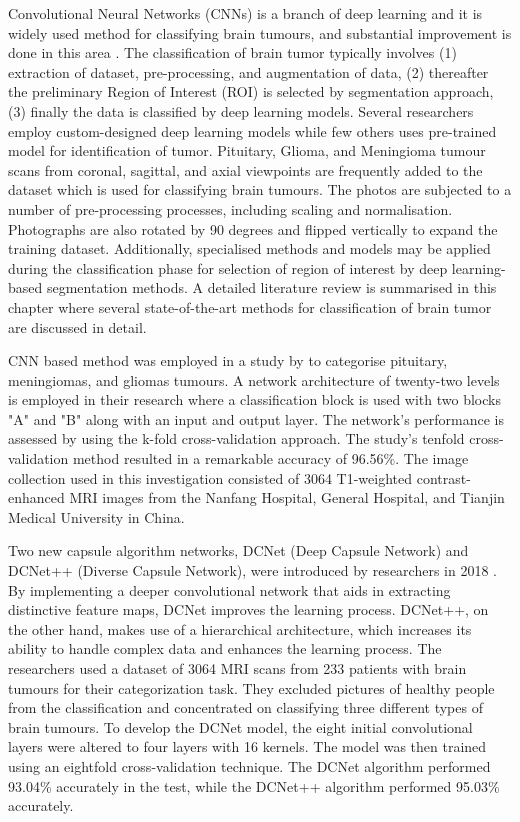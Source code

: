 \documentclass[12pt, a4paper,twoside]{report}
\theoremstyle{plain} %
\theoremstyle{definition} %
\theoremstyle{remark} %
\numberwithin{equation}{chapter}
\begin{document}
Convolutional Neural Networks (CNNs) is a branch of deep learning and it is widely used method for classifying brain tumours, and substantial improvement is done in this area \cite{ali22}. The classification of brain tumor typically involves (1) extraction of dataset, pre-processing, and augmentation of data, (2) thereafter the preliminary Region of Interest (ROI) is selected by segmentation approach, (3) finally the data is classified by deep learning models. Several researchers employ  custom-designed deep learning models while few others uses pre-trained model for identification of tumor. Pituitary, Glioma, and Meningioma tumour scans from coronal, sagittal, and axial viewpoints are frequently added to the dataset which is used for classifying brain tumours. The photos are subjected to a number of pre-processing processes, including scaling and normalisation. Photographs are also rotated by 90 degrees and flipped vertically to expand the training dataset. Additionally, specialised methods and models may be applied during the classification phase for selection of region of interest by deep learning-based segmentation methods. A detailed literature review is summarised in this chapter where several state-of-the-art methods for classification of brain tumor are discussed in detail.

CNN based method was employed in a study by \cite{badza20} to categorise pituitary, meningiomas, and gliomas tumours. A network architecture of twenty-two levels is employed in their research where a classification block is used with two blocks "A" and "B" along with an input and output layer. The network's performance is assessed by using the k-fold cross-validation approach. The study's tenfold cross-validation method resulted in a remarkable accuracy of 96.56\%. The image collection used in this investigation consisted of 3064 T1-weighted contrast-enhanced MRI images from the Nanfang Hospital, General Hospital, and Tianjin Medical University in China.

Two new capsule algorithm networks, DCNet (Deep Capsule Network) and DCNet++ (Diverse Capsule Network), were introduced by researchers in 2018 \cite{phaye18}. By implementing a deeper convolutional network that aids in extracting distinctive feature maps, DCNet improves the learning process. DCNet++, on the other hand, makes use of a hierarchical architecture, which increases its ability to handle complex data and enhances the learning process. The researchers used a dataset of 3064 MRI scans from 233 patients with brain tumours for their categorization task. They excluded pictures of healthy people from the classification and concentrated on classifying three different types of brain tumours. To develop the DCNet model, the eight initial convolutional layers were altered to four layers with 16 kernels. The model was then trained using an eightfold cross-validation technique. The DCNet algorithm performed 93.04\% accurately in the test, while the DCNet++ algorithm performed 95.03\% accurately.
\end{document}
